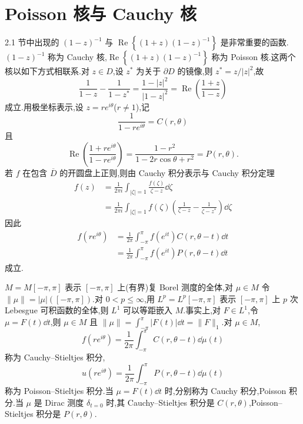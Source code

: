 \section{Poisson 核与 Cauchy 核}\label{sec:2.2}


2.1 节中出现的 $(1-z)^{-1}$ 与 $\operatorname{Re}\left\{(1+z)(1-z)^{-1}\right\}$ 是非常重要的函数.$(1-z)^{-1}$ 称为 Cauchy 核,$\operatorname{Re}\left\{(1+z)(1-z)^{-1}\right\}$ 称为 Poisson 核.这两个核以如下方式相联系.对 $z \in D$,设 $z^{*}$ 为关于 $\partial D$ 的镜像,则 $z^{*} = z/|z|^{2}$,故
\begin{equation*}
\frac{1}{1 - z} - \frac{1}{1 - z^{*}} = \frac{1 - |z|^{2}}{|1 - z|^{2}} = \operatorname{Re}\left(\frac{1 + z}{1 - z}\right)
\end{equation*}
成立.用极坐标表示,设 $z = re^{i\theta}$($r \neq 1$),记
\begin{equation*}
\frac{1}{1 - re^{i\theta}} = C(r, \theta)
\end{equation*}
且
\begin{equation*}
\operatorname{Re}\left(\frac{1 + re^{i\theta}}{1 - re^{i\theta}}\right) = \frac{1 - r^{2}}{1 - 2r\cos\theta + r^{2}} = P(r, \theta).
\end{equation*}
若 $f$ 在包含 $\overline{D}$ 的开圆盘上正则,则由 Cauchy 积分表示与 Cauchy 积分定理
\begin{align*}
f(z) & = \frac{1}{2\pi i}\int_{|\zeta| = 1}\frac{f(\zeta)}{\zeta - z}\dd\zeta \\
& = \frac{1}{2\pi i}\int_{|\zeta| = 1}f(\zeta)\left(\frac{1}{\zeta - z} - \frac{1}{\zeta - z^{*}}\right)\dd\zeta
\end{align*}
因此
\begin{align*}
f(re^{i\theta}) & = \frac{1}{2\pi}\int_{-\pi}^{\pi}f(e^{it})C(r, \theta - t)\dd t \\
& = \frac{1}{2\pi}\int_{-\pi}^{\pi}f(e^{it})P(r, \theta - t)\dd t
\end{align*}
成立.

$M = M[-\pi, \pi]$ 表示 $[-\pi, \pi]$ 上(有界)复 Borel 测度的全体,对 $\mu \in M$ 令 $\|\mu\| = |\mu|([-\pi, \pi])$.对 $0 < p \leq \infty$,用 $L^{p} = L^{p}[-\pi, \pi]$ 表示 $[-\pi, \pi]$ 上 $p$ 次 Lebesgue 可积函数的全体,则 $L^{1}$ 可以等距嵌入 $M$.事实上,对 $F \in L^{1}$,令 $\mu = F(t)\dd t$,则 $\mu \in M$ 且 $\|\mu\| = \int_{-\pi}^{\pi}|F(t)|\dd t = \|F\|_{1}$.对 $\mu \in M$,
\begin{equation*}
f(re^{i\theta}) = \frac{1}{2\pi}\int_{-\pi}^{\pi}C(r, \theta - t)\dd\mu(t)
\end{equation*}
称为 Cauchy--Stieltjes 积分,
\begin{equation*}
u(re^{i\theta}) = \frac{1}{2\pi}\int_{-\pi}^{\pi}P(r, \theta - t)\dd\mu(t)
\end{equation*}
称为 Poisson--Stieltjes 积分.当 $\mu = F(t)\dd t$ 时,分别称为 Cauchy 积分,Poisson 积分.当 $\mu$ 是 Dirac 测度 $\delta_{t=0}$ 时,其 Cauchy--Stieltjes 积分是 $C(r, \theta)$,Poisson--Stieltjes 积分是 $P(r, \theta)$.

